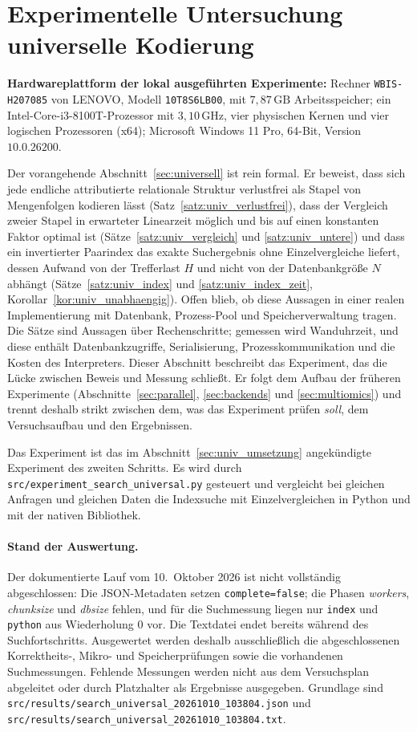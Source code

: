 \documentclass[a4paper,12pt, twoside]{report}
\newcommand{\experimenthardware}{%
	\par\smallskip\noindent
	\textbf{Hardwareplattform der lokal ausgeführten Experimente:} Rechner \texttt{WBIS-H207085} von LENOVO, Modell \texttt{10T8S6LB00}, mit $7{,}87\,\mathrm{GB}$ Arbeitsspeicher; ein Intel-Core-i3-8100T-Prozessor mit $3{,}10\,\mathrm{GHz}$, vier physischen Kernen und vier logischen Prozessoren (x64); Microsoft Windows 11 Pro, 64-Bit, Version $10.0.26200$.
	\par\smallskip}
\theoremstyle{definition}
\begin{document}
\chapter{Experimentelle Untersuchung universelle Kodierung}
\label{sec:univ_experiment}

\experimenthardware

Der vorangehende Abschnitt~\ref{sec:universell} ist rein formal. Er beweist, dass sich jede endliche attributierte relationale Struktur verlustfrei als Stapel von Mengenfolgen kodieren lässt (Satz~\ref{satz:univ_verlustfrei}), dass der Vergleich zweier Stapel in erwarteter Linearzeit möglich und bis auf einen konstanten Faktor optimal ist (Sätze~\ref{satz:univ_vergleich} und \ref{satz:univ_untere}) und dass ein invertierter Paarindex das exakte Suchergebnis ohne Einzelvergleiche liefert, dessen Aufwand von der Trefferlast $H$ und nicht von der Datenbankgröße $N$ abhängt (Sätze~\ref{satz:univ_index} und \ref{satz:univ_index_zeit}, Korollar~\ref{kor:univ_unabhaengig}). Offen blieb, ob diese Aussagen in einer realen Implementierung mit Datenbank, Prozess-Pool und Speicherverwaltung tragen. Die Sätze sind Aussagen über Rechenschritte; gemessen wird Wanduhrzeit, und diese enthält Datenbankzugriffe, Serialisierung, Prozesskommunikation und die Kosten des Interpreters. Dieser Abschnitt beschreibt das Experiment, das die Lücke zwischen Beweis und Messung schließt. Er folgt dem Aufbau der früheren Experimente (Abschnitte~\ref{sec:parallel}, \ref{sec:backends} und \ref{sec:multiomics}) und trennt deshalb strikt zwischen dem, was das Experiment prüfen \emph{soll}, dem Versuchsaufbau und den Ergebnissen.

Das Experiment ist das im Abschnitt~\ref{sec:univ_umsetzung} angekündigte Experiment des zweiten Schritts. Es wird durch \texttt{src/experiment\_search\_universal.py} gesteuert und vergleicht bei gleichen Anfragen und gleichen Daten die Indexsuche mit Einzelvergleichen in Python und mit der nativen Bibliothek.

\subsubsection{Stand der Auswertung.} Der dokumentierte Lauf vom 10.\ Oktober 2026 ist nicht vollständig abgeschlossen: Die JSON-Metadaten setzen \texttt{complete=false}; die Phasen \emph{workers}, \emph{chunksize} und \emph{dbsize} fehlen, und für die Suchmessung liegen nur \texttt{index} und \texttt{python} aus Wiederholung $0$ vor. Die Textdatei endet bereits während des Suchfortschritts. Ausgewertet werden deshalb ausschließlich die abgeschlossenen Korrektheits-, Mikro- und Speicherprüfungen sowie die vorhandenen Suchmessungen. Fehlende Messungen werden nicht aus dem Versuchsplan abgeleitet oder durch Platzhalter als Ergebnisse ausgegeben. Grundlage sind \texttt{src/results/search\_universal\_20261010\_103804.json} und \texttt{src/results/search\_universal\_20261010\_103804.txt}.
\end{document}
